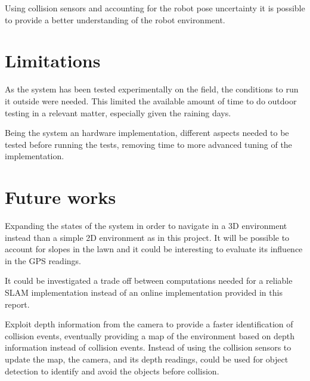 Using collision sensors and accounting for the robot pose uncertainty it is possible to provide a better understanding of the robot environment.


\section{Limitations}
\label{sec:limitations}
\noindent As the system has been tested experimentally on the field, the conditions to run it outside were needed.
This limited the available amount of time to do outdoor testing in a relevant matter, especially given the raining days.

Being the system an hardware implementation, different aspects needed to be tested before running the tests, removing time to more advanced tuning of the implementation.

\section{Future works}
\label{sec:futureWork}


\noindent
Expanding the states of the system in order to navigate in a 3D environment instead than a simple 2D environment as in this project.
It will be possible to account for slopes in the lawn and it could be interesting to evaluate its influence in the GPS readings.


It could be investigated a trade off between computations needed for a reliable SLAM implementation instead of an online implementation provided in this report.


Exploit depth information from the camera to provide a faster identification of collision events, eventually providing a map of the environment based on depth information instead of collision events.
Instead of using the collision sensors to update the map, the camera, and its depth readings,  could be used for object detection to identify and avoid the objects before collision.


